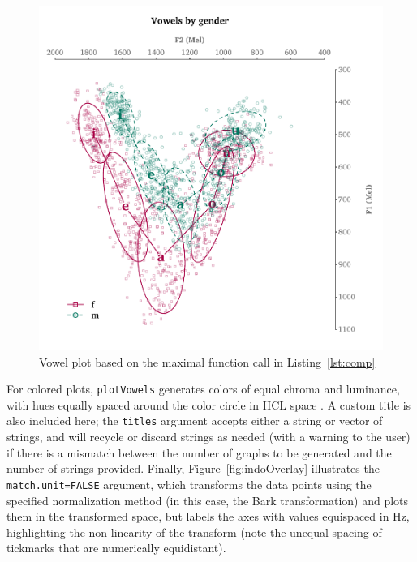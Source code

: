 \documentclass[12pt,oneside]{article}
\begin{document}
\begin{figure}[H]
	\begin{center}
		\includegraphics[keepaspectratio=true,scale=1]{indoMaximal.pdf} %
		\caption{Vowel plot based on the maximal function call in Listing~\ref{lst:comp}}
		\label{fig:indoMaximal}
	\end{center}
\end{figure}

For colored plots, \texttt{plotVowels} generates colors of equal chroma and luminance, with hues equally spaced around the color circle in HCL space \citep{hcl}.  A custom title is also included here; the \texttt{titles} argument accepts either a string or vector of strings, and will recycle or discard strings as needed (with a warning to the user) if there is a mismatch between the number of graphs to be generated and the number of strings provided.  Finally, Figure~\ref{fig:indoOverlay} illustrates the \texttt{match.unit=FALSE} argument, which transforms the data points using the specified normalization method (in this case, the Bark transformation) and plots them in the transformed space, but labels the axes with values equispaced in Hz, highlighting the non-linearity of the transform (note the unequal spacing of tickmarks that are numerically equidistant).
\end{document}
